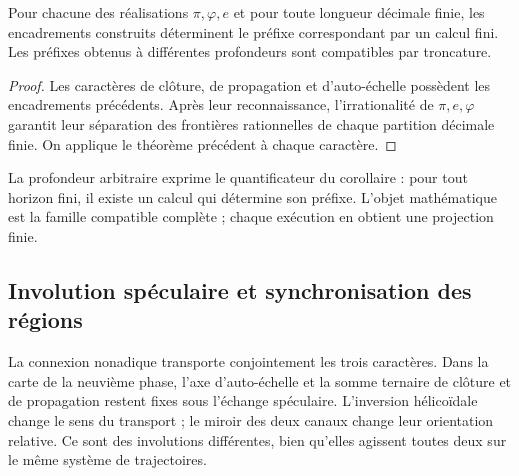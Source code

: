 \begin{corollary}
\label{x_reciprocidad:gen:prefijos-regionales}
Pour chacune des réalisations \(\pi,\varphi,e\) et pour toute longueur
décimale finie, les encadrements construits déterminent le préfixe correspondant
par un calcul fini. Les préfixes obtenus à différentes profondeurs
sont compatibles par troncature.
\end{corollary}
\begin{proof}
Les caractères de clôture, de propagation et d'auto-échelle possèdent les encadrements précédents. Après leur reconnaissance, l'irrationalité de \(\pi,e,\varphi\) garantit leur séparation des frontières rationnelles de chaque partition décimale finie. On applique le théorème précédent à chaque caractère.
\end{proof}
La profondeur arbitraire exprime le quantificateur du corollaire : pour tout
horizon fini, il existe un calcul qui détermine son préfixe. L'objet
mathématique est la famille compatible complète ; chaque exécution en obtient une
projection finie.

\subsection{Involution spéculaire et synchronisation des régions}

La connexion nonadique transporte conjointement les trois caractères. Dans la carte de la neuvième phase, l'axe d'auto-échelle et la somme ternaire de clôture et de propagation restent fixes sous l'échange spéculaire. L'inversion hélicoïdale change le sens du transport ; le miroir des deux canaux change leur orientation relative. Ce sont des involutions différentes, bien qu'elles agissent toutes deux sur le même système de trajectoires.

